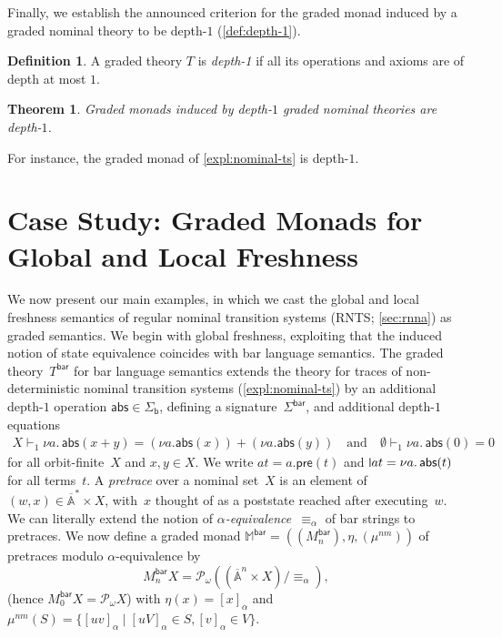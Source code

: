 \documentclass[11pt,a4paper]{amsart}
\newtheorem{theorem}{Theorem}[section]
\newcommand{\Br}{\mathsf{bar}}
\newcommand{\pre}{\mathsf{pre}}
\newcommand{\abs}{\mathsf{abs}}
\newcommand{\sigb}{\Sigma_{\mathsf b}}
\newcommand{\Names}{\mathbb{A}}
\newcommand{\barNames}{\overline{\Names}}
\newcommand{\alphaeq}{\equiv_\alpha}
\newcommand{\pow}{\mathcal{P}}
\newcommand{\powf}{\pow_{\omega}}
\theoremstyle{plain}
\newcommand{\midmid}{\hspace{0.2ex}{\rule[-0.1ex]{0.6pt}{1.65ex}}\hspace{0.2ex}}
\newcommand{\newletter}[1]{{\midmid}#1}
\numberwithin{equation}{section}
\newcommand{\monad}{{\mathbb{M}}}
\newcommand{\+}[1]{\mathcal{#1}\xspace}
\theoremstyle{definition}
\newtheorem{defn}[defn]{Definition}
\begin{document}
\noindent Finally, we establish the announced criterion for the graded
monad induced by a graded nominal theory to be depth-$1$
(\cref{def:depth-1}).
\begin{defn}
  A graded theory \(T\) is \emph{depth-1} if all its operations and
  axioms are of depth at most $1$.
\end{defn}
\begin{theorem}\label{thm:depth1}
  Graded monads induced by depth-$1$ graded nominal theories are
  depth-$1$.
\end{theorem}
\noindent For instance, the graded monad of \cref{expl:nominal-ts} is
depth-$1$.


\section{Case Study: Graded Monads for Global and  Local Freshness}
\label{sec:local-freshness}

\noindent We now present our main examples, in which we cast the
global and local freshness semantics of regular nominal transition
systems (RNTS; \cref{sec:rnna}) as graded semantics. We begin with
global freshness, exploiting that the induced notion of state
equivalence coincides with bar language semantics. The graded
theory~$T^{\Br}$ for bar language semantics extends the theory for
traces of non-deterministic nominal transition systems
(\cref{expl:nominal-ts}) by an additional depth-$1$ operation
$\abs\in\sigb$, defining a signature~$\Sigma^{\Br}$, and additional
depth-$1$ equations
\begin{gather}
  X\vdash_1\nu a.\,\abs(x+y)=(\nu a.\abs(x))+(\nu a.\abs(y))
  \quad\text{and}\quad
  \emptyset\vdash_1\nu a.\,\abs(0)=0 \label{ax:distributivity-abs}
\end{gather}
for all orbit-finite~$X$ and $x,y\in X$. We write
$at=a.\pre(t)$ and $\newletter at=\nu a.\,\abs(t)$ for all
terms~$t$. A \emph{pretrace} over a nominal set~$X$ is an element of
$(w,x)\in\barNames^*\times X$, with~$x$ thought of as a poststate
reached after executing~$w$. We can literally extend the notion of
\emph{$\alpha$-equivalence}~$\alphaeq$ of bar strings to pretraces.
We now define a graded monad $\monad^\Br=((M^\Br_n),\eta,(\mu^{nm}))$
of pretraces modulo $\alpha$-equivalence by
\begin{equation*}
  M^\Br_nX=\powf((\barNames^n\times X)/\alphaeq),
\end{equation*}
(hence $M^\Br_0X=\powf X$) with $\eta(x)=[x]_\alpha$ and
$\mu^{nm}(S)=\{[uv]_\alpha\mid [uV]_\alpha\in S,[v]_\alpha\in V\}$.
\end{document}
